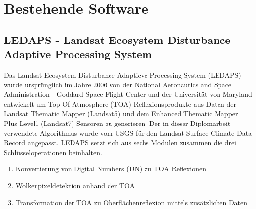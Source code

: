 \documentclass[11pt]{report}
\begin{document}
\section{Bestehende Software}
\subsection{LEDAPS - Landsat Ecosystem Disturbance Adaptive Processing System }
Das Landsat Ecosystem Disturbance Adapticve Processing System (LEDAPS) wurde ursprünglich im Jahre 2006 von der National Aeronautics and Space Administration - Goddard Space Flight Center und der Universität von Maryland entwickelt um Top-Of-Atmosphere (TOA) Reflexionsprodukte aus Daten der  Landsat Thematic Mapper (Landsat5) und dem Enhanced Thematic Mapper Plus Level1 (Landsat7) Sensoren zu generieren. Der in dieser Diplomarbeit verwendete Algorithmus wurde vom USGS für den Landsat Surface Climate Data Record angepasst.
LEDAPS setzt sich aus sechs Modulen zusammen die drei Schlüsseloperationen beinhalten.

\begin{enumerate}
\item Konvertierung von Digital Numbers (DN) zu TOA Reflexionen
\item Wolkenpixeldetektion anhand der TOA
\item Transformation der TOA zu Oberflächenreflexion mittels zusätzlichen Daten
\end{enumerate}
\end{document}
